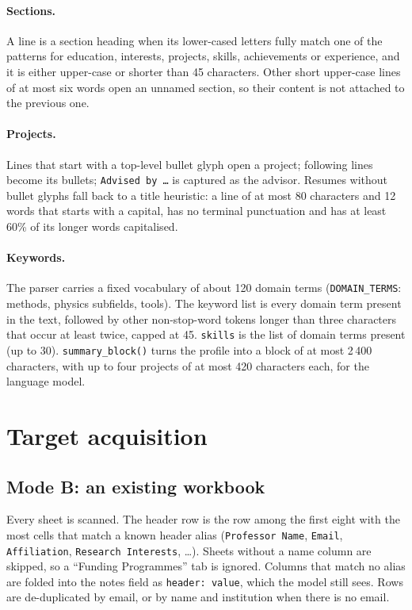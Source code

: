 \documentclass[11pt,a4paper]{article}
\newcommand{\code}[1]{\texttt{#1}}
\begin{document}
\paragraph{Sections.} A line is a section heading when its lower-cased letters fully match one of
the patterns for education, interests, projects, skills, achievements or experience, and it is
either upper-case or shorter than 45 characters. Other short upper-case lines of at most six
words open an unnamed section, so their content is not attached to the previous one.

\paragraph{Projects.} Lines that start with a top-level bullet glyph open a project; following
lines become its bullets; \code{Advised by \ldots} is captured as the advisor. Resumes without
bullet glyphs fall back to a title heuristic: a line of at most 80 characters and 12 words that
starts with a capital, has no terminal punctuation and has at least 60\% of its longer words
capitalised.

\paragraph{Keywords.} The parser carries a fixed vocabulary of about 120 domain terms
(\code{DOMAIN\_TERMS}: methods, physics subfields, tools). The keyword list is every domain term
present in the text, followed by other non-stop-word tokens longer than three characters that
occur at least twice, capped at 45. \code{skills} is the list of domain terms present (up to
30). \code{summary\_block()} turns the profile into a block of at most 2\,400 characters, with
up to four projects of at most 420 characters each, for the language model.

\section{Target acquisition}

\subsection{Mode B: an existing workbook}
Every sheet is scanned. The header row is the row among the first eight with the most cells that
match a known header alias (\code{Professor Name}, \code{Email}, \code{Affiliation},
\code{Research Interests}, \ldots). Sheets without a name column are skipped, so a
``Funding Programmes'' tab is ignored. Columns that match no alias are folded into the notes
field as \code{header: value}, which the model still sees. Rows are de-duplicated by email, or by
name and institution when there is no email.
\end{document}
